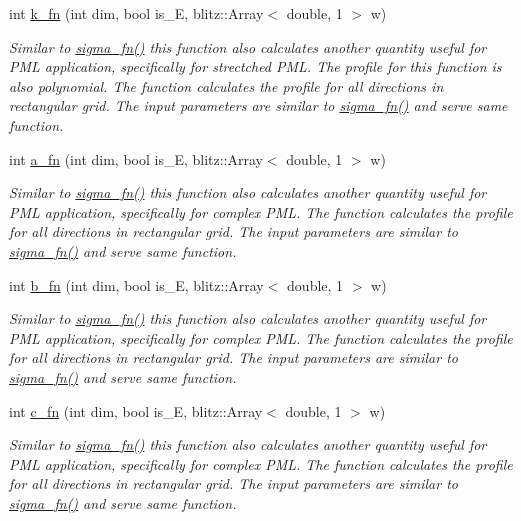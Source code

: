 \begin{DoxyCompactItemize}
int \hyperlink{classmaxwell_af719ef0b11001e31c61fce0913c10aa3}{k\+\_\+fn} (int dim, bool is\+\_\+E, blitz\+::\+Array$<$ double, 1 $>$ w)
\begin{DoxyCompactList}\small\item\em Similar to \hyperlink{classmaxwell_af806ab1486ebc79103b41171d46d759b}{sigma\+\_\+fn()} this function also calculates another quantity useful for P\+ML application, specifically for strectched P\+ML. The profile for this function is also polynomial. The function calculates the profile for all directions in rectangular grid. The input parameters are similar to \hyperlink{classmaxwell_af806ab1486ebc79103b41171d46d759b}{sigma\+\_\+fn()} and serve same function. \end{DoxyCompactList}\item 
int \hyperlink{classmaxwell_a99dfee634d6c6c38ca534b8e41ddc40f}{a\+\_\+fn} (int dim, bool is\+\_\+E, blitz\+::\+Array$<$ double, 1 $>$ w)
\begin{DoxyCompactList}\small\item\em Similar to \hyperlink{classmaxwell_af806ab1486ebc79103b41171d46d759b}{sigma\+\_\+fn()} this function also calculates another quantity useful for P\+ML application, specifically for complex P\+ML. The function calculates the profile for all directions in rectangular grid. The input parameters are similar to \hyperlink{classmaxwell_af806ab1486ebc79103b41171d46d759b}{sigma\+\_\+fn()} and serve same function. \end{DoxyCompactList}\item 
int \hyperlink{classmaxwell_ad2e22e0c7f09134063c995fdf82ad1b0}{b\+\_\+fn} (int dim, bool is\+\_\+E, blitz\+::\+Array$<$ double, 1 $>$ w)
\begin{DoxyCompactList}\small\item\em Similar to \hyperlink{classmaxwell_af806ab1486ebc79103b41171d46d759b}{sigma\+\_\+fn()} this function also calculates another quantity useful for P\+ML application, specifically for complex P\+ML. The function calculates the profile for all directions in rectangular grid. The input parameters are similar to \hyperlink{classmaxwell_af806ab1486ebc79103b41171d46d759b}{sigma\+\_\+fn()} and serve same function. \end{DoxyCompactList}\item 
int \hyperlink{classmaxwell_a7f5df69501f7b1d28e6833ee76a5fa14}{c\+\_\+fn} (int dim, bool is\+\_\+E, blitz\+::\+Array$<$ double, 1 $>$ w)
\begin{DoxyCompactList}\small\item\em Similar to \hyperlink{classmaxwell_af806ab1486ebc79103b41171d46d759b}{sigma\+\_\+fn()} this function also calculates another quantity useful for P\+ML application, specifically for complex P\+ML. The function calculates the profile for all directions in rectangular grid. The input parameters are similar to \hyperlink{classmaxwell_af806ab1486ebc79103b41171d46d759b}{sigma\+\_\+fn()} and serve same function. \end{DoxyCompactList}\item 

\end{DoxyCompactItemize}
